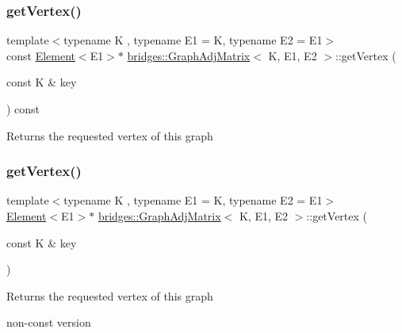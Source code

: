 \subsubsection{\texorpdfstring{get\+Vertex()}{getVertex()}\hspace{0.1cm}{\footnotesize\ttfamily [1/2]}}
{\footnotesize\ttfamily template$<$typename K , typename E1  = K, typename E2  = E1$>$ \\
const \mbox{\hyperlink{classbridges_1_1_element}{Element}}$<$E1$>$$\ast$ \mbox{\hyperlink{classbridges_1_1_graph_adj_matrix}{bridges\+::\+Graph\+Adj\+Matrix}}$<$ K, E1, E2 $>$\+::get\+Vertex (\begin{DoxyParamCaption}\item[{const K \&}]{key }\end{DoxyParamCaption}) const\hspace{0.3cm}{\ttfamily [inline]}}

\begin{DoxyReturn}{Returns}
the requested vertex of this graph 
\end{DoxyReturn}
\mbox{\label{classbridges_1_1_graph_adj_matrix_a5a565f419080f4aea685a89c98223920}} 
\subsubsection{\texorpdfstring{get\+Vertex()}{getVertex()}\hspace{0.1cm}{\footnotesize\ttfamily [2/2]}}
{\footnotesize\ttfamily template$<$typename K , typename E1  = K, typename E2  = E1$>$ \\
\mbox{\hyperlink{classbridges_1_1_element}{Element}}$<$E1$>$$\ast$ \mbox{\hyperlink{classbridges_1_1_graph_adj_matrix}{bridges\+::\+Graph\+Adj\+Matrix}}$<$ K, E1, E2 $>$\+::get\+Vertex (\begin{DoxyParamCaption}\item[{const K \&}]{key }\end{DoxyParamCaption})\hspace{0.3cm}{\ttfamily [inline]}}

\begin{DoxyReturn}{Returns}
the requested vertex of this graph
\end{DoxyReturn}
non-\/const version \mbox{\label{classbridges_1_1_graph_adj_matrix_a11be29f76acebc6fd9a495ba81dc883d}} 
